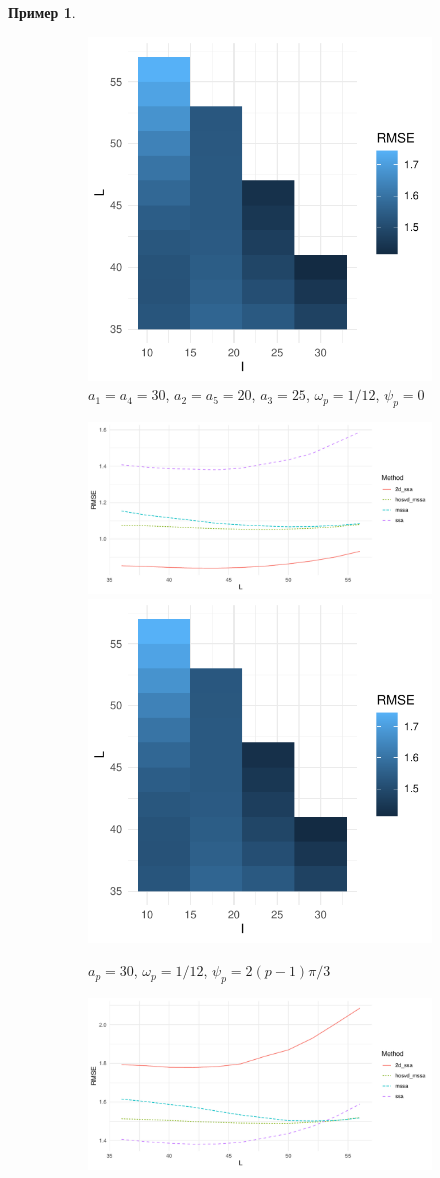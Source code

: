 \documentclass[specialist,
    substylefile = spbu_report.rtx,
    subf,href,colorlinks=true, 12pt]{disser}
\theoremstyle{plain}
\theoremstyle{definition}
\newtheorem{example}{Пример}[section]
\theoremstyle{remark}
\begin{document}
\begin{example}
\begin{figure}
\begin{subfigure}{.95\linewidth}
                \includegraphics[width=.34\linewidth]{five-series-second_hooi}
                \caption{$a_1=a_4 = 30$, $a_2=a_5=20$, $a_3=25$, $\omega_p=1/12$, $\psi_p=0$}
            \end{subfigure} \par\medskip
            \begin{subfigure}{.95\linewidth}
                \includegraphics[width=.66\linewidth]{five-series-third}\hfill
                \includegraphics[width=.34\linewidth]{five-series-third_hooi}
                \caption{$a_p = 30$, $\omega_p=1/12$, $\psi_p=2(p-1)\pi/3$}
            \end{subfigure} \par\medskip
            \begin{subfigure}{.95\linewidth}
                \includegraphics[width=.66\linewidth]{five-series-fourth}\hfill

\end{subfigure}
\end{figure}
\end{example}
\end{document}
